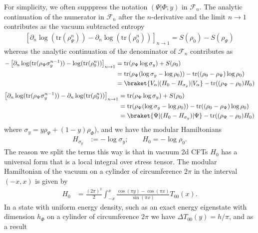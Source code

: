 \documentclass[11pt]{article}
\newcommand{\tr}{\mathrm{tr}}
\newcommand{\nn}{\nonumber}
\begin{document}
For simplicity, we often supppress the notation $(\Psi|\Phi;y)$ in $\mathcal{F}_n$.
The analytic continuation of the numerator in $\mathcal{F}_n$ after the $n$-derivative and the limit $n\to 1$ contributes as the vacuum subtracted entropy
\begin{align}
  \left[\partial_n\log(\tr(\rho_\Psi^n))- \partial_n\log(\tr(\rho_0^n))\right]_{n\to 1}=S(\rho_0)-S(\rho_\Psi)
\end{align}
whereas the analytic continuation of the denominator of $\mathcal{F}_n$ contributes as 
\begin{align}
-\left[\partial_n\log(\tr(\rho_\Psi \sigma_y^{n-1}))-\log(\tr(\rho_0^n)) \right]_{n\to 1}&=\tr(\rho_\Psi\log\sigma_y)+S(\rho_0)\nn\\
&=\tr(\rho_\Psi(\log\sigma_y-\log \rho_0))-\tr((\rho_0-\rho_\Psi)\log\rho_0)\nn\\
&=\braket{V_\alpha|(H_0-H_{\sigma_y})|V_\alpha}-\tr((\rho_\Psi-\rho_0)H_0)
\end{align}
\begin{align}
\left[\partial_n\log(\tr(\rho_\Psi \sigma_y^{n-1}))-\partial_n\log(\tr(\rho_0^n)) \right]_{n\to 1}&=\tr(\rho_\Psi\log\sigma_y)+S(\rho_0)\nn\\
&=\tr(\rho_\Psi(\log\sigma_y-\log \rho_0))-\tr((\rho_0-\rho_\Psi)\log\rho_0)\nn\\
&=\braket{\Psi|(H_0-H_{\sigma_y})|\Psi}-\tr((\rho_\Psi-\rho_0)H_0)
\end{align}
where 
$\sigma_y=y\rho_\Psi+(1-y)\rho_\Phi$), and we have the modular Hamiltonians
\begin{align}
  H_{\sigma_y}&:=-\log\sigma_y; \qquad H_0=-\log\rho_0.
\end{align}
The reason we split the terms this way is that in vacuum 2d CFTs $H_0$ has a universal form that is a local integral over stress tensor. The modular Hamiltonian of the vacuum on a cylinder of circumference $2\pi$ in the interval $(-x,x)$ is given by
\begin{align}
H_0&=\frac{(2\pi)^2}{2}\int_{-x}^x\frac{\cos(\pi y)-\cos(\pi x)}{\sin(\pi x)}T_{00}(x).
\end{align}
In a state with uniform energy density, such as an exact energy eigenstate with dimension $h_\Phi$ on a cylinder of circumference $2\pi$ we have $\Delta T_{00}(y)=h/\pi$, and as a result
\end{document}
